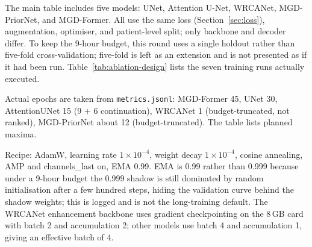The main table includes five models: UNet, Attention U-Net, WRCANet, MGD-PriorNet, and MGD-Former. All use the same loss (Section~\ref{sec:loss}), augmentation, optimiser, and patient-level split; only backbone and decoder differ. To keep the 9-hour budget, this round uses a single holdout rather than five-fold cross-validation; five-fold is left as an extension and is not presented as if it had been run. Table~\ref{tab:ablation-design} lists the seven training runs actually executed.

\begin{table}[t]
\centering
\caption{Experiment matrix for the 9-hour budget. All runs share the patient-level split, preprocessing, loss, and inference protocol; the leaky control uses an image-level split.}
\label{tab:ablation-design}
\small
{}
\vspace{2pt}
\footnotesize Actual epochs are taken from \texttt{metrics.jsonl}: MGD-Former 45, UNet 30, AttentionUNet 15 (9 + 6 continuation), WRCANet 1 (budget-truncated, not ranked), MGD-PriorNet about 12 (budget-truncated). The table lists planned maxima.
\end{table}

Recipe: AdamW, learning rate $1\times10^{-4}$, weight decay $1\times10^{-4}$, cosine annealing, AMP and channels\_last on, EMA 0.99. EMA is 0.99 rather than 0.999 because under a 9-hour budget the 0.999 shadow is still dominated by random initialisation after a few hundred steps, hiding the validation curve behind the shadow weights; this is logged and is not the long-training default. The WRCANet enhancement backbone uses gradient checkpointing on the 8\,GB card with batch 2 and accumulation 2; other models use batch 4 and accumulation 1, giving an effective batch of 4.

